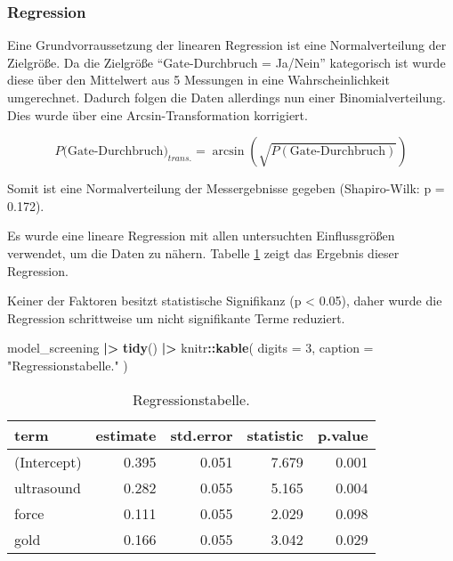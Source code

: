 \documentclass[
  paper=a4,
  ,captions=tableheading
]{scrartcl}
\newenvironment{Shaded}{\begin{snugshade}}{\end{snugshade}}
\newcommand{\DataTypeTok}[1]{\textcolor[rgb]{0.13,0.29,0.53}{#1}}
\newcommand{\DecValTok}[1]{\textcolor[rgb]{0.00,0.00,0.81}{#1}}
\newcommand{\ErrorTok}[1]{\textcolor[rgb]{0.64,0.00,0.00}{\textbf{#1}}}
\newcommand{\KeywordTok}[1]{\textcolor[rgb]{0.13,0.29,0.53}{\textbf{#1}}}
\newcommand{\NormalTok}[1]{#1}
\newcommand{\OperatorTok}[1]{\textcolor[rgb]{0.81,0.36,0.00}{\textbf{#1}}}
\newcommand{\StringTok}[1]{\textcolor[rgb]{0.31,0.60,0.02}{#1}}
\begin{document}
\hypertarget{regression}{%
\subsubsection{Regression}\label{regression}}

Eine Grundvorraussetzung der linearen Regression ist eine Normalverteilung der Zielgröße. Da die Zielgröße \enquote{Gate-Durchbruch = Ja/Nein} kategorisch ist wurde diese über den Mittelwert aus 5 Messungen in eine Wahrscheinlichkeit umgerechnet. Dadurch folgen die Daten allerdings nun einer Binomialverteilung. Dies wurde über eine Arcsin-Transformation korrigiert.

\[ P(\text{Gate-Durchbruch)}_{trans.} = \arcsin\left(\sqrt{P(\text{Gate-Durchbruch})}\right)\]

Somit ist eine Normalverteilung der Messergebnisse gegeben (Shapiro-Wilk: p = 0.172).

Es wurde eine lineare Regression mit allen untersuchten Einflussgrößen verwendet, um die Daten zu nähern. Tabelle \ref{tab:screening-regression1} zeigt das Ergebnis dieser Regression.

Keiner der Faktoren besitzt statistische Signifikanz (p \textless{} 0.05), daher wurde die Regression schrittweise um nicht signifikante Terme reduziert.

\begin{Shaded}
\begin{Highlighting}[]
\NormalTok{model_screening }\OperatorTok{|}\ErrorTok{>}\StringTok{ }
\StringTok{  }\KeywordTok{tidy}\NormalTok{() }\OperatorTok{|}\ErrorTok{>}\StringTok{ }
\StringTok{  }\NormalTok{knitr}\OperatorTok{::}\KeywordTok{kable}\NormalTok{(}
    \DataTypeTok{digits =} \DecValTok{3}\NormalTok{,}
    \DataTypeTok{caption =} \StringTok{"Regressionstabelle."}
\NormalTok{  )}
\end{Highlighting}
\end{Shaded}

\begin{table}

\caption{\label{tab:screening-regression1}Regressionstabelle.}
\centering
\begin{tabular}[t]{l|r|r|r|r}
\hline
term & estimate & std.error & statistic & p.value\\
\hline
(Intercept) & 0.395 & 0.051 & 7.679 & 0.001\\
\hline
ultrasound & 0.282 & 0.055 & 5.165 & 0.004\\
\hline
force & 0.111 & 0.055 & 2.029 & 0.098\\
\hline
gold & 0.166 & 0.055 & 3.042 & 0.029\\
\hline
\end{tabular}
\end{table}
\end{document}
